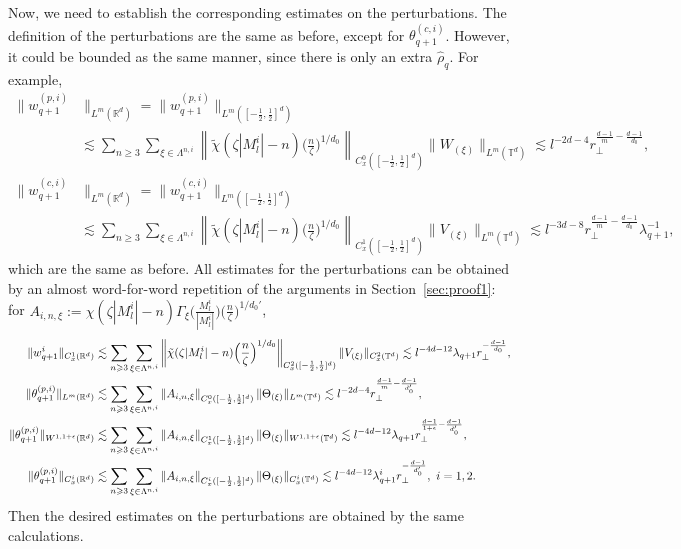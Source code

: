 \documentclass[UTF-8,reqno]{amsart}
\numberwithin{equation}{section}
\theoremstyle{definition}
\def\({{\Big(}}
\def\){{\Big)}}
\newcommand{\norm}[1]{\left\|#1\right\|}
\def\geq{\geqslant}
\def\({{\Big(}}
\def\){{\Big)}}
\def\geq{\geqslant}
\begin{document}
Now, we need to  establish the corresponding estimates on the perturbations.  
  The definition of the perturbations are the same as before, except for $\theta_{q+1}^{(c,i)}$. However, it could be bounded as the same manner, since there is only an extra $\hat{\rho}_q$.  For example, 
\begin{align*}\|w_{q+1}^{(p,i)}&\|_{L^m(\mathbb{R}^d)}=\|w_{q+1}^{(p,i)}\|_{L^m([-\frac12,\frac12]^d)}\\
&\lesssim\sum_{n\geq3}\sum_{\xi\in\Lambda^{n,i}}\norm{\tilde{\chi}  (\zeta |M^i_l|-n) \(\frac{n}{\zeta }\)^{1/d_0}}_ {C_{x}^0([-\frac12,\frac12]^d)}\|W_{ (\xi)}\|_{L^m(\mathbb{T}^d)}\lesssim l^{-2d-4}r_\perp^{\frac{d-1}{m}-\frac{d-1}{d_0}},\\
\|w_{q+1}^{(c,i)}&\|_{L^m(\mathbb{R}^d)}=\|w_{q+1}^{(c,i)}\|_{L^m([-\frac12,\frac12]^d)}\\
&\lesssim\sum_{n\geq3}\sum_{\xi\in\Lambda^{n,i}}\norm{\tilde{\chi}(\zeta |M^i_l|-n)  \(\frac{n}{\zeta }\)^{1/d_0}}_{C^1_{x}([-\frac12,\frac12]^d)}\|V_{ (\xi)}\|_{L^m(\mathbb{T}^d)}\lesssim l^{-3d-8}r_\perp^{\frac{d-1}{m}-\frac{d-1}{d_0}}\lambda_{q+1}^{-1},
\end{align*}
which are the same as before. All estimates for the perturbations can be obtained by an almost word-for-word repetition of the arguments in Section~\ref{sec:proof1}: for $A_{i,n,\xi}:=\chi(\zeta |M^i_l|-n)\Gamma_{\xi}\(\frac{M^i_l}{|M^i_l|}\)\(\frac{n}{\zeta }\)^{1/d_0'}$,
\begin{align}
\|w_{q+1}^i\|_{C_{x}^1(\mathbb{R}^d)}&\lesssim  \sum_{n\geq3}\sum_{\xi\in\Lambda^{n,i}}\norm{\tilde{\chi}(\zeta |M^i_l|-n) \(\frac{n}{\zeta }\)^{1/d_0}}_{C_{x}^{2}([-\frac12,\frac12]^d)}\|  V_{ (\xi)}\|_{C_{x}^2(\mathbb{T}^d)} \lesssim  l^{-4d-12}\lambda_{q+1} r_\perp^{-\frac{d-1}{d_0}},\notag\\
\|\theta_{q+1}^{(p,i)} \|_{L^{m}(\mathbb{R}^d)}&\lesssim\sum_{n\geq3}\sum_{\xi\in\Lambda^{n,i}}\norm{A_{i,n,\xi}}_{C_{x}^0([-\frac12,\frac12]^d)}\|\Theta_{ (\xi)} \|_{L^{m}(\mathbb{T}^d)} \lesssim l^{-2d-4}r_\perp^{\frac{d-1}{m}-\frac{d-1}{d_0'}} ,\notag\\
\|\theta_{q+1}^{(p,i)}\|_{W^{1,1+\epsilon}(\mathbb{R}^d)}&\lesssim\sum_{n\geq3}\sum_{\xi\in\Lambda^{n,i}}\norm{A_{i,n,\xi}}_ {C_{x}^1([-\frac12,\frac12]^d)}\|\Theta_{ (\xi)} \|_{W^{1,1+\epsilon}(\mathbb{T}^d)} \lesssim l^{-4d-12}\lambda_{q+1}r_\perp^{\frac{d-1}{1+\epsilon}-\frac{d-1}{d_0'}}
 ,\notag\\
\|\theta_{q+1}^{(p,i)} \|_ {C_{x}^i(\mathbb{R}^d)} 
&\lesssim\sum_{n\geq3}\sum_{\xi\in\Lambda^{n,i}}\norm{A_{i,n,\xi}}_ {C_{x}^i([-\frac12,\frac12]^d)}\|\Theta_{ (\xi)} \|_ {C_{x}^i(\mathbb{T}^d)} \lesssim l^{-4d-12}\lambda_{q+1}^i r_\perp^{-\frac{d-1}{d_0'}},\ i=1,2.\notag
\end{align}
 Then the desired estimates on the perturbations are obtained by the same calculations.
  
\end{document}
